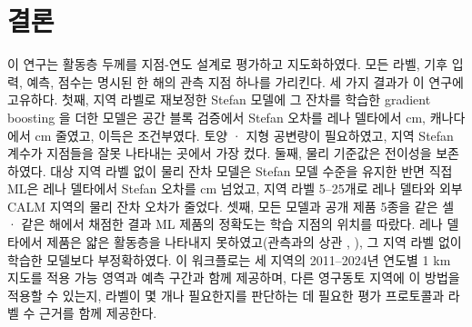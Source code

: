 \section{결론}\label{sec:conclusions}
이 연구는 활동층 두께를 지점-연도 설계로 평가하고 지도화하였다. 모든 라벨, 기후 입력, 예측, 점수는 명시된 한 해의 관측 지점 하나를 가리킨다. 세 가지 결과가 이 연구에 고유하다. 첫째, 지역 라벨로 재보정한 Stefan 모델에 그 잔차를 학습한 gradient boosting 을 더한 모델은 공간 블록 검증에서 Stefan 오차를 레나 델타에서 \ndrefLeblkRoabs{} cm, 캐나다에서 \ndrefCablkRoabs{} cm 줄였고, 이득은 조건부였다. 토양 · 지형 공변량이 필요하였고, 지역 Stefan 계수가 지점들을 잘못 나타내는 곳에서 가장 컸다. 둘째, 물리 기준값은 전이성을 보존하였다. 대상 지역 라벨 없이 물리 잔차 모델은 Stefan 모델 수준을 유지한 반면 직접 ML은 레나 델타에서 Stefan 오차를 \ndrefLeregDzabs{} cm 넘었고, 지역 라벨 5--25개로 레나 델타와 외부 CALM 지역의 물리 잔차 오차가 줄었다. 셋째, 모든 모델과 공개 제품 5종을 같은 셀 · 같은 해에서 채점한 결과 ML 제품의 정확도는 학습 지점의 위치를 따랐다. 레나 델타에서 제품은 얇은 활동층을 나타내지 못하였고(관측과의 상관 \nrLeWei{}, \nrLeLiu), 그 지역 라벨 없이 학습한 모델보다 부정확하였다. 이 워크플로는 세 지역의 2011--2024년 연도별 1 km 지도를 적용 가능 영역과 예측 구간과 함께 제공하며, 다른 영구동토 지역에 이 방법을 적용할 수 있는지, 라벨이 몇 개나 필요한지를 판단하는 데 필요한 평가 프로토콜과 라벨 수 근거를 함께 제공한다.
